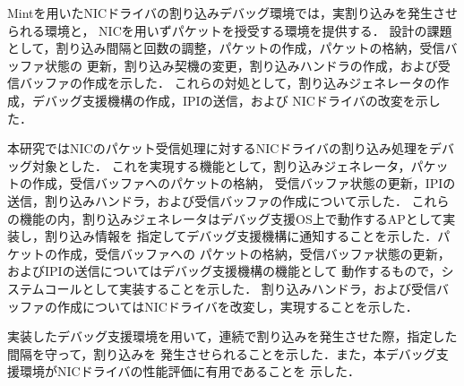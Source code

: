 \documentclass[submit,techreq,noauthor,dvipdfmx]{ipsj}
\begin{document}
Mintを用いたNICドライバの割り込みデバッグ環境では，実割り込みを発生させられる環境と，
NICを用いずパケットを授受する環境を提供する．
設計の課題として，割り込み間隔と回数の調整，パケットの作成，パケットの格納，受信バッファ状態の
更新，割り込み契機の変更，割り込みハンドラの作成，および受信バッファの作成を示した．
これらの対処として，割り込みジェネレータの作成，デバッグ支援機構の作成，IPIの送信，および
NICドライバの改変を示した．

本研究ではNICのパケット受信処理に対するNICドライバの割り込み処理をデバッグ対象とした．
これを実現する機能として，割り込みジェネレータ，パケットの作成，受信バッファへのパケットの格納，
受信バッファ状態の更新，IPIの送信，割り込みハンドラ，および受信バッファの作成について示した．
これらの機能の内，割り込みジェネレータはデバッグ支援OS上で動作するAPとして実装し，割り込み情報を
指定してデバッグ支援機構に通知することを示した．パケットの作成，受信バッファへの
パケットの格納，受信バッファ状態の更新，およびIPIの送信についてはデバッグ支援機構の機能として
動作するもので，システムコールとして実装することを示した．
割り込みハンドラ，および受信バッファの作成についてはNICドライバを改変し，実現することを示した．

実装したデバッグ支援環境を用いて，連続で割り込みを発生させた際，指定した間隔を守って，割り込みを
発生させられることを示した．また，本デバッグ支援環境がNICドライバの性能評価に有用であることを
示した．


\end{document}
